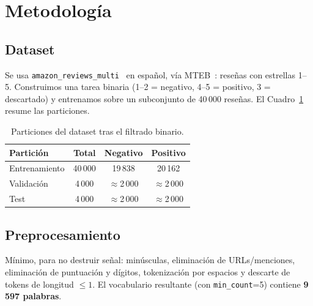 \documentclass[11pt]{article}
\begin{document}
\section{Metodología}\label{sec:metodo}

\subsection{Dataset}
Se usa \texttt{amazon\_reviews\_multi}~\cite{keung2020} en español, vía
MTEB~\cite{muennighoff2023}: reseñas con estrellas 1--5. Construimos una tarea binaria
(1--2 = negativo, 4--5 = positivo, 3 = descartado) y entrenamos sobre un subconjunto de
40\,000 reseñas. El Cuadro~\ref{tab:dataset} resume las particiones.
\begin{table}[H]
\centering
\caption{Particiones del dataset tras el filtrado binario.}\label{tab:dataset}
\begin{tabular}{lccc}
\toprule
Partición & Total & Negativo & Positivo \\
\midrule
Entrenamiento & 40\,000 & 19\,838 & 20\,162 \\
Validación & 4\,000 & $\approx$2\,000 & $\approx$2\,000 \\
Test & 4\,000 & $\approx$2\,000 & $\approx$2\,000 \\
\bottomrule
\end{tabular}
\end{table}

\subsection{Preprocesamiento}
Mínimo, para no destruir señal: minúsculas, eliminación de URLs/menciones, eliminación de
puntuación y dígitos, tokenización por espacios y descarte de tokens de longitud $\le 1$. El
vocabulario resultante (con \texttt{min\_count}=5) contiene \textbf{9\,597 palabras}.
\end{document}
